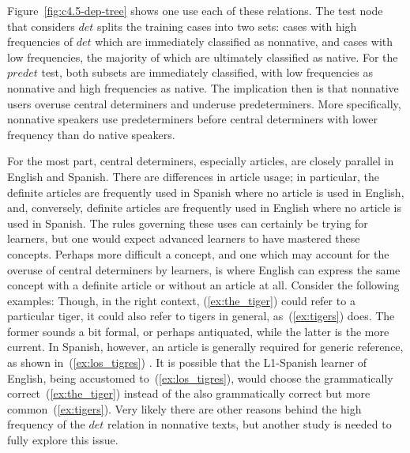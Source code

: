 \documentclass[main.tex]{subfiles}
\begin{document}
Figure~\ref{fig:c4.5-dep-tree} shows one use each of these relations. The test node that considers $det$ splits the training cases into two sets: cases with high frequencies of $det$ which are immediately classified as nonnative, and cases with low frequencies, the majority of which are ultimately classified as native. For the $predet$ test, both subsets are immediately classified, with low frequencies as nonnative and high frequencies as native. The implication then is that nonnative users overuse central determiners and underuse predeterminers. More specifically, nonnative speakers use predeterminers before central determiners with lower frequency than do native speakers.

For the most part, central determiners, especially articles, are closely parallel in English and Spanish. There are differences in article usage; in particular, the definite articles are frequently used in Spanish where no article is used in English, and, conversely, definite articles are frequently used in English where no article is used in Spanish. The rules governing these uses can certainly be trying for learners, but one would expect advanced learners to have mastered these concepts. Perhaps more difficult a concept, and one which may account for the overuse of central determiners by learners, is where English can express the same concept with a definite article or without an article at all. Consider the following examples:
Though, in the right context, (\ref{ex:the_tiger}) could refer to a particular tiger, it could also refer to tigers in general, as~(\ref{ex:tigers}) does. The former sounds a bit formal, or perhaps antiquated, while the latter is the more current. In Spanish, however, an article is generally required for generic reference, as shown in~(\ref{ex:los_tigres}) \citep[Ch. 8.3.3]{whitley:1986}. It is possible that the L1-Spanish learner of English, being accustomed to~(\ref{ex:los_tigres}), would choose the grammatically correct~(\ref{ex:the_tiger}) instead of the also grammatically correct but more common~(\ref{ex:tigers}). Very likely there are other reasons behind the high frequency of the $det$ relation in nonnative texts, but another study is needed to fully explore this issue.
\end{document}
